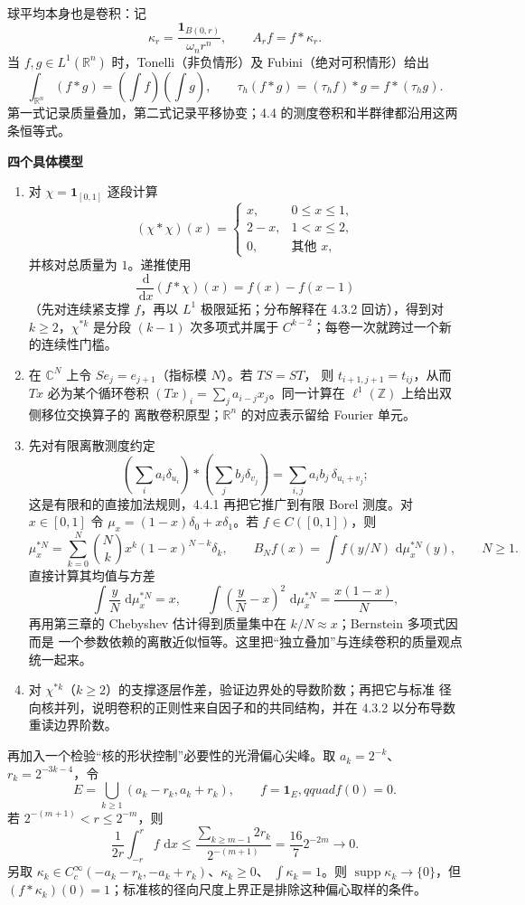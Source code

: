 \documentclass[11pt,a4paper]{ctexart}
\newcommand{\R}{\mathbb R}
\newcommand{\dd}{\,\mathrm d}
\newcommand{\planitem}[1]{\par\smallskip\noindent\textcolor{deepblue}{\textbf{#1}}\quad}
\begin{document}
球平均本身也是卷积：记
\[
 \kappa_r=\frac{\mathbf1_{B(0,r)}}{\omega_nr^n},\qquad A_rf=f*\kappa_r.
\]
当 $f,g\in L^1(\R^n)$ 时，Tonelli（非负情形）及 Fubini（绝对可积情形）给出
\[
 \int_{\R^n}(f*g)=\left(\int f\right)\left(\int g\right),
 \qquad \tau_h(f*g)=(\tau_hf)*g=f*(\tau_hg).
\]
第一式记录质量叠加，第二式记录平移协变；4.4 的测度卷积和半群律都沿用这两条恒等式。

\planitem{四个具体模型}
\begin{enumerate}
\item 对 $\chi=\mathbf1_{[0,1]}$ 逐段计算
\[
 (\chi*\chi)(x)=
 \begin{cases}x,&0\le x\le1,\\2-x,&1<x\le2,\\0,&\text{其他 }x,
 \end{cases}
\]
并核对总质量为 $1$。递推使用
\[
 \frac{\dd}{\dd x}(f*\chi)(x)=f(x)-f(x-1)
\]
（先对连续紧支撑 $f$，再以 $L^1$ 极限延拓；分布解释在 4.3.2 回访），得到对 $k\ge2$，$\chi^{*k}$ 是分段
$(k-1)$ 次多项式并属于 $C^{k-2}$；每卷一次就跨过一个新的连续性门槛。
\item 在 $\mathbb C^N$ 上令 $S e_j=e_{j+1}$（指标模 $N$）。若 $TS=ST$，
则 $t_{i+1,j+1}=t_{ij}$，从而 $Tx$ 必为某个循环卷积
$(Tx)_i=\sum_ja_{i-j}x_j$。同一计算在 $\ell^1(\mathbb Z)$ 上给出双侧移位交换算子的
离散卷积原型；$\R^n$ 的对应表示留给 Fourier 单元。
\item 先对有限离散测度约定
\[
\left(\sum_i a_i\delta_{u_i}\right)*\left(\sum_j b_j\delta_{v_j}\right)
 =\sum_{i,j}a_i b_j\,\delta_{u_i+v_j};
\]
这是有限和的直接加法规则，4.4.1 再把它推广到有限 Borel 测度。对
$x\in[0,1]$ 令 $\mu_x=(1-x)\delta_0+x\delta_1$。若
$f\in C([0,1])$，则
\[
 \mu_x^{*N}=\sum_{k=0}^N\binom Nkx^k(1-x)^{N-k}\delta_k,
 \qquad
 B_Nf(x)=\int f(y/N)\,\dd\mu_x^{*N}(y),\qquad N\ge1.
\]
直接计算其均值与方差
\[
\int \frac{y}{N}\,\dd\mu_x^{*N}=x,
\qquad
\int\left(\frac{y}{N}-x\right)^2\,\dd\mu_x^{*N}=\frac{x(1-x)}{N},
\]
再用第三章的 Chebyshev 估计得到质量集中在 $k/N\approx x$；Bernstein 多项式因而是
一个参数依赖的离散近似恒等。这里把“独立叠加”与连续卷积的质量观点统一起来。
\item 对 $\chi^{*k}$（$k\ge2$）的支撑逐层作差，验证边界处的导数阶数；再把它与标准
径向核并列，说明卷积的正则性来自因子和的共同结构，并在 4.3.2 以分布导数重读边界阶数。
\end{enumerate}

再加入一个检验“核的形状控制”必要性的光滑偏心尖峰。取
$a_k=2^{-k}$、$r_k=2^{-3k-4}$，令
\[
 E=\bigcup_{k\ge1}(a_k-r_k,a_k+r_k),\qquad f=\mathbf1_E,qquad f(0)=0.
\]
若 $2^{-(m+1)}<r\le2^{-m}$，则
\[
 \frac1{2r}\int_{-r}^{r}f\,\dd x
 \le\frac{\sum_{k\ge m-1}2r_k}{2^{-(m+1)}}
 =\frac{16}{7}2^{-2m}\longrightarrow0.
\]
另取 $\kappa_k\in C_c^\infty(-a_k-r_k,-a_k+r_k)$、$\kappa_k\ge0$、
$\int\kappa_k=1$。则 $\operatorname{supp}\kappa_k\to\{0\}$，但
$(f*\kappa_k)(0)=1$；标准核的径向尺度上界正是排除这种偏心取样的条件。
\end{document}
